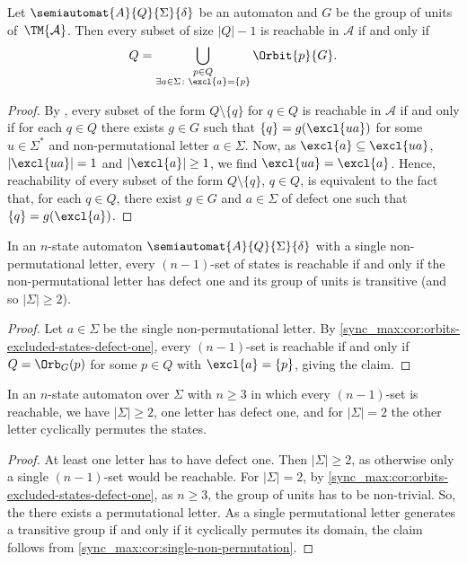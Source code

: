\begin{proposition}\label{sync_max:cor:orbits-excluded-states-defect-one}
	Let $\semiautomat{A}{Q}{\Sigma}{\delta}$
	be an automaton and $G$ be the group of units of~$\TM{\mathcal A}$.
	Then every subset of size $|Q|- 1$ is reachable
	in $\mathcal A$ if and only if 
	\[ Q = \bigcup_{\substack{p \in Q \\ \exists a \in \Sigma \colon \excl{a} = \{p\}}} \Orbit{p}{G}.
	\]
\end{proposition}
\begin{proof}
	By ,
	every subset of the form $Q \setminus \{q\}$ for $q \in Q$
	is reachable in $\mathcal A$
	if and only if for each $q \in Q$
	there exists $g \in G$ such that $\{q\} = g(\excl{ua})$ for some $u \in \Sigma^*$
	and non-permutational letter $a \in \Sigma$.
	Now, as $\excl{a} \subseteq \excl{ua}$, $|\excl{ua}| = 1$ 
	and $|\excl{a}| \ge 1$, we find $\excl{ua} = \excl{a}$.
	Hence, reachability of every subset of the form $Q \setminus \{q\}$, $q \in Q$,
	is equivalent to the fact that, for each $q \in Q$,
	there exist  $g \in G$ and $a \in \Sigma$ of defect one
	such that $\{q\} = g(\excl{a})$.
\end{proof}
  
\begin{corollary}\label{sync_max:cor:single-non-permutation}
	In an $n$-state automaton $\semiautomat{A}{Q}{\Sigma}{\delta}$
	with a single non-permutational letter, every $(n-1)$-set of states is reachable
	if and only if the non-permutational letter has defect one
	and its group of units is transitive (and so $|\Sigma| \ge 2$).
\end{corollary} 
\begin{proof}
	Let $a \in \Sigma$ be the single non-permutational letter.
	By \cref{sync_max:cor:orbits-excluded-states-defect-one},
	every $(n-1)$-set is reachable
	if and only if $Q =  \Orb_G(p)$ 
	for some $p \in Q$ with $\excl{a} = \{p\}$, giving the claim.
\end{proof}

\begin{corollary}\label{sync_max:cor2:single-non-permutation}
	In an $n$-state automaton over $\Sigma$ with $n \ge 3$ 
	in which every $(n-1)$-set is reachable,
	we have $|\Sigma| \ge 2$, one letter has defect one, and for $|\Sigma| = 2$ 
	the other letter cyclically permutes the states.
\end{corollary}
\begin{proof}
	At least one letter has to have defect one.
	Then $|\Sigma| \ge 2$, as otherwise only a single $(n-1)$-set
	would be reachable.	
	For $|\Sigma| = 2$, by \cref{sync_max:cor:orbits-excluded-states-defect-one}, as $n \ge 3$,
	the group of units has to be non-trivial.
	So, the there exists a permutational letter.
	As a single permutational letter generates a transitive
	group if and only if it cyclically permutes its domain,
	the claim follows from \cref{sync_max:cor:single-non-permutation}.
\end{proof}

